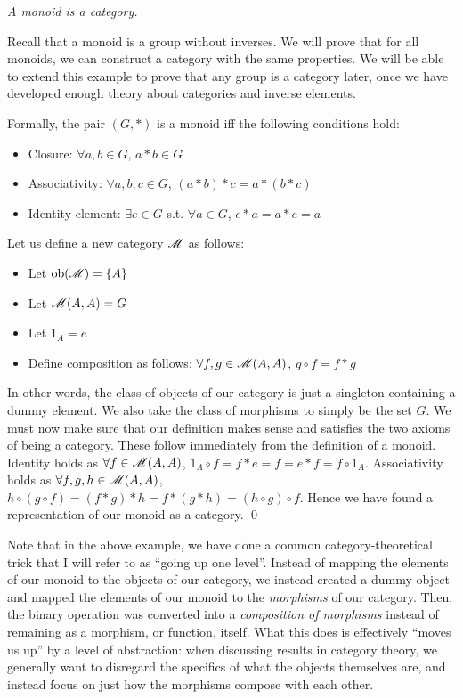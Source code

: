 \documentclass[../thesis.tex]{subfiles}
\begin{document}
\begin{ex}
\label{ex:monoid}
\textit{A monoid is a category.}

Recall that a monoid is a group without inverses.
We will prove that for all monoids, we can construct a category with the same properties.
We will be able to extend this example to prove that any group is a category later, once we have developed enough theory about categories and inverse elements.

Formally, the pair $(G,*)$ is a monoid iff the following conditions hold:
\begin{itemize}
    \item Closure: $\forall a,b\in G$, $a*b\in G$
    \item Associativity: $\forall a,b,c \in G$, $(a*b)*c=a*(b*c)$
    \item Identity element: $\exists e\in G$ s.t. $\forall a\in G$, $e*a=a*e=a$
\end{itemize}

Let us define a new category $\mathscr{M}$ as follows:
\begin{itemize}
    \item Let $\operatorname{ob}(\mathscr{M}) = \{A\}$
    \item Let $\mathscr{M}(A,A) = G$
    \item Let $1_A=e$
    \item Define composition as follows: $\forall f,g\in \mathscr{M}(A,A)$, $g\circ f = f*g$
\end{itemize}

In other words, the class of objects of our category is just a singleton containing a dummy element.
We also take the class of morphisms to simply be the set $G$.
We must now make sure that our definition makes sense and satisfies the two axioms of being a category.
These follow immediately from the definition of a monoid.
Identity holds as $\forall f\in \mathscr{M}(A,A)$, $1_A \circ f = f*e = f = e*f = f \circ 1_A$.
Associativity holds as $\forall f,g,h\in \mathscr{M}(A,A)$, $h \circ (g \circ f) = (f*g)*h = f*(g*h) = (h \circ g) \circ f$.
Hence we have found a representation of our monoid as a category.
\qed
\end{ex}

Note that in the above example, we have done a common category-theoretical trick that I will refer to as ``going up one level''.
Instead of mapping the elements of our monoid to the objects of our category, we instead created a dummy object and mapped the elements of our monoid to the \textit{morphisms} of our category.
Then, the binary operation was converted into a \textit{composition of morphisms} instead of remaining as a morphism, or function, itself.
What this does is effectively ``moves us up'' by a level of abstraction: when discussing results in category theory, we generally want to disregard the specifics of what the objects themselves are, and instead focus on just how the morphisms compose with each other.
\end{document}
